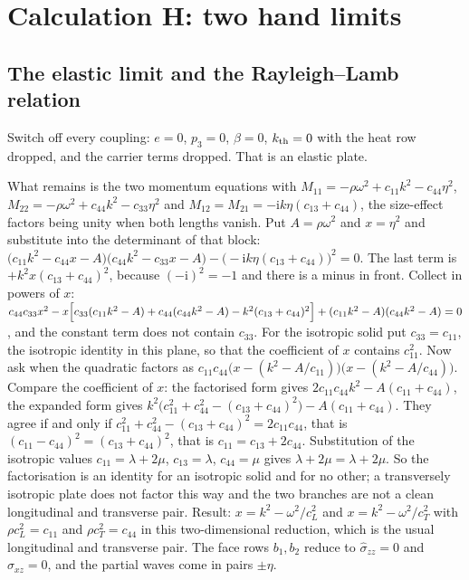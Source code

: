 \documentclass[11pt]{article}
\makeatletter
\newif\ifshowworked
\newenvironment{worked}{%
  \ifshowworked\par\smallskip\noindent\textit{Working.}\par\smallskip\else
  \setbox\z@\vbox\bgroup\fi}{\ifshowworked\par\smallskip\else\egroup\fi}
\newcommand{\ii}{\mathrm{i}}
\makeatother
\begin{document}
\section{Calculation H: two hand limits}\label{sec:calcH}

\subsection*{The elastic limit and the Rayleigh--Lamb relation}

Switch off every coupling: $e=0$, $p_3=0$, $\beta=0$, $k_{\rm th}=0$ with the heat row dropped, and the
carrier terms dropped. That is an elastic plate.

\begin{worked}
What remains is the two momentum equations with $M_{11}=-\rho\omega^2+c_{11}k^2-c_{44}\eta^2$,
$M_{22}=-\rho\omega^2+c_{44}k^2-c_{33}\eta^2$ and $M_{12}=M_{21}=-\ii k\eta(c_{13}+c_{44})$, the
size-effect factors being unity when both lengths vanish. Put $A=\rho\omega^2$ and $x=\eta^2$ and
substitute into the determinant of that block:
$\bigl(c_{11}k^2-c_{44}x-A\bigr)\bigl(c_{44}k^2-c_{33}x-A\bigr)-\bigl(-\ii k\eta(c_{13}+c_{44})\bigr)^2=0$.
The last term is $+k^2x(c_{13}+c_{44})^2$, because $(-\ii)^2=-1$ and there is a minus in front. Collect
in powers of $x$:
$c_{44}c_{33}x^2-x\Bigl[c_{33}(c_{11}k^2-A)+c_{44}(c_{44}k^2-A)-k^2(c_{13}+c_{44})^2\Bigr]
+(c_{11}k^2-A)(c_{44}k^2-A)=0$, and the constant term does not contain $c_{33}$. For the isotropic solid put $c_{33}=c_{11}$, the isotropic
identity in this plane, so that the coefficient of $x$ contains $c_{11}^2$.
Now ask when the quadratic factors as $c_{11}c_{44}\bigl(x-(k^2-A/c_{11})\bigr)\bigl(x-(k^2-A/c_{44})\bigr)$.
Compare the coefficient of $x$: the factorised form gives $2c_{11}c_{44}k^2-A(c_{11}+c_{44})$, the
expanded form gives $k^2\bigl(c_{11}^2+c_{44}^2-(c_{13}+c_{44})^2\bigr)-A(c_{11}+c_{44})$. They agree if
and only if $c_{11}^2+c_{44}^2-(c_{13}+c_{44})^2=2c_{11}c_{44}$, that is
$(c_{11}-c_{44})^2=(c_{13}+c_{44})^2$, that is $c_{11}=c_{13}+2c_{44}$.
Substitution of the isotropic values $c_{11}=\lambda+2\mu$, $c_{13}=\lambda$, $c_{44}=\mu$ gives
$\lambda+2\mu=\lambda+2\mu$. So the factorisation is an identity for an isotropic solid and for no other;
a transversely isotropic plate does not factor this way and the two branches are not a clean
longitudinal and transverse pair.
Result: $x=k^2-\omega^2/c_L^2$ and $x=k^2-\omega^2/c_T^2$ with $\rho c_L^2=c_{11}$ and
$\rho c_T^2=c_{44}$ in this two-dimensional reduction, which is the usual longitudinal and transverse
pair. The face rows $b_1,b_2$ reduce to $\hat\sigma_{zz}=0$ and $\hat\sigma_{xz}=0$, and the partial waves
come in pairs $\pm\eta$.
\end{worked}
\end{document}
